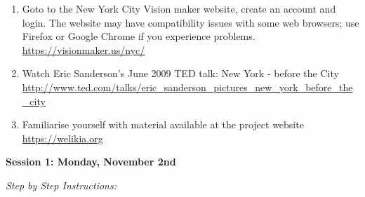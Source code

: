 \documentclass{article}
\begin{document}
\begin{enumerate}[leftmargin=15mm]

\item Goto to the New York City Vision maker website, create an account and login.  The website may have compatibility issues with some web browsers; use Firefox or Google Chrome if you experience problems. \\ 
\url{https://visionmaker.us/nyc/}

\item Watch Eric Sanderson's June 2009 TED talk: New York - before the City \\  
\url{http://www.ted.com/talks/eric_sanderson_pictures_new_york_before_the_city}

\item Familiarise yourself with material available at the project website \\ 
\url{https://welikia.org}

\end{enumerate}


\large{\textbf{Session 1: Monday, November 2nd}}

\vspace{4mm}
\setlength{\leftskip}{1cm}
\textit{Step by Step Instructions:}
\end{document}
